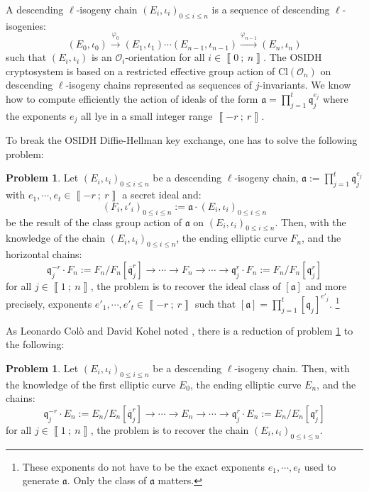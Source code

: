 \documentclass[a4paper,10pt]{article}
\theoremstyle{definition}
\theoremstyle{plain}
\theoremstyle{definition}
\newtheorem{problem}[definition]{Problem}
\newcommand{\mO}{\mathcal{O}}
\renewcommand{\i}[2]{\left\llbracket #1~;~#2\right\rrbracket}
\renewcommand{\(}{\left(}
\renewcommand{\)}{\right)}
\newcommand{\mf}[1]{\mathfrak{#1}}
\begin{document}
A descending $\ell$-isogeny chain $(E_i, \iota_i)_{0\leq i\leq n}$ is a sequence of descending $\ell$-isogenies:
\[(E_0, \iota_0)\overset{\varphi_0}{\longrightarrow}(E_1,\iota_1)\cdots(E_{n-1},\iota_{n-1})\overset{\varphi_{n-1}}{\longrightarrow}(E_n,\iota_n)\]
such that $(E_i, \iota_i)$ is an $\mO_i$-orientation for all $i\in\i{0}{n}$. The OSIDH cryptosystem is based on a restricted effective group action of $\mbox{Cl}(\mO_n)$ on descending $\ell$-isogeny chains represented as sequences of $j$-invariants.  We know how to compute efficiently the action of ideals of the form $\mf{a}=\prod_{j=1}^t\mf{q}_j^{e_j}$ where the exponents $e_j$ all lye in a small integer range $\i{-r}{r}$. 

To break the OSIDH Diffie-Hellman key exchange, one has to solve the following problem:

\begin{problem}\label{problem 1}
Let $(E_i,\iota_i)_{0\leq i\leq n}$ be a descending $\ell$-isogeny chain, $\mf{a}:=\prod_{j=1}^t\mf{q}_j^{e_j}$ with $e_1,\cdots, e_t\in\i{-r}{r}$ a secret ideal and:
\[(F_i,\iota'_i)_{0\leq i\leq n}:=\mf{a}\cdot (E_i,\iota_i)_{0\leq i\leq n}\]
be the result of the class group action of $\mf{a}$ on $(E_i,\iota_i)_{0\leq i\leq n}$. Then, with the knowledge of the chain $(E_i,\iota_i)_{0\leq i\leq n}$, the ending elliptic curve $F_n$, and the horizontal chains:
\[\mf{q}_j^{-r}\cdot F_n:=F_n/F_n[\overline{\mf{q}}_j^r]\longrightarrow \cdots \longrightarrow F_n\longrightarrow \cdots\longrightarrow \mf{q}_j^{r}\cdot F_n:=F_n/F_n[\mf{q}_j^r]\]
for all $j\in\i{1}{n}$, the problem is to recover the ideal class of $[\mf{a}]$ and more precisely, exponents $e'_1, \cdots, e'_t\in\i{-r}{r}$ such that $[\mf{a}]=\prod_{j=1}^t [\mf{q}_j]^{e'_j}$. \footnote{These exponents do not have to be the exact exponents $e_1, \cdots, e_t$ used to generate $\mf{a}$. Only the class of $\mf{a}$ matters.}
\end{problem}

As Leonardo Col\`{o} and David Kohel noted \cite[§ 5.3]{OSIDH}, there is a reduction of problem \ref{problem 1} to the following:

\begin{problem}\label{problem 2}
Let $(E_i,\iota_i)_{0\leq i\leq n}$ be a descending $\ell$-isogeny chain. Then, with the knowledge of the first elliptic curve $E_0$, the ending elliptic curve $E_n$, and the chains:
\[\mf{q}_j^{-r}\cdot E_n:=E_n/E_n[\overline{\mf{q}}_j^r]\longrightarrow \cdots \longrightarrow E_n\longrightarrow \cdots\longrightarrow \mf{q}_j^{r}\cdot E_n:=E_n/E_n[\mf{q}_j^r]\]
for all $j\in\i{1}{n}$, the problem is to recover the chain $(E_i,\iota_i)_{0\leq i\leq n}$.
\end{problem}
\end{document}
